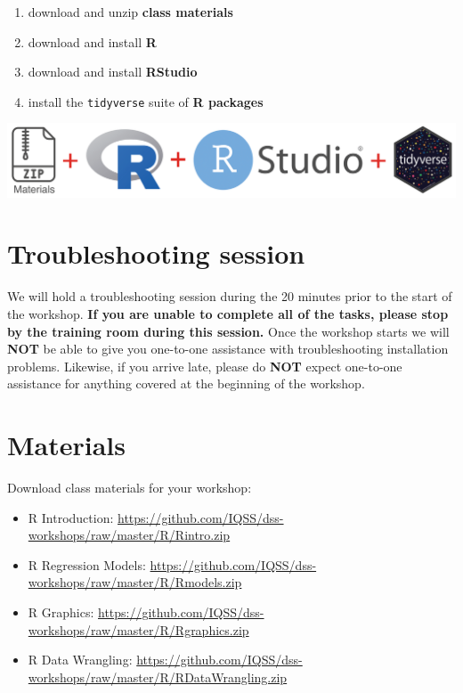 \documentclass[
]{book}
\providecommand{\tightlist}{%
  \setlength{\itemsep}{0pt}\setlength{\parskip}{0pt}}
\begin{document}
\begin{enumerate}
\def\labelenumi{\arabic{enumi}.}
\tightlist
\item
  download and unzip \textbf{class materials}
\item
  download and install \textbf{R}
\item
  download and install \textbf{RStudio}
\item
  install the \texttt{tidyverse} suite of \textbf{R packages}
\end{enumerate}

\includegraphics{R/Rinstall/images/install_software_R.png}

\hypertarget{troubleshooting-session}{%
\section{Troubleshooting session}\label{troubleshooting-session}}

We will hold a troubleshooting session during the 20 minutes prior to the start of the workshop.
\textbf{If you are unable to complete all of the tasks, please stop by the training room during this session.}
Once the workshop starts we will \textbf{NOT} be able to give you one-to-one assistance with troubleshooting installation problems. Likewise, if you arrive late, please do \textbf{NOT} expect one-to-one assistance for anything covered at the beginning of the workshop.

\hypertarget{materials}{%
\section{Materials}\label{materials}}

Download class materials for your workshop:

\begin{itemize}
\tightlist
\item
  R Introduction: \url{https://github.com/IQSS/dss-workshops/raw/master/R/Rintro.zip}
\item
  R Regression Models: \url{https://github.com/IQSS/dss-workshops/raw/master/R/Rmodels.zip}
\item
  R Graphics: \url{https://github.com/IQSS/dss-workshops/raw/master/R/Rgraphics.zip}
\item
  R Data Wrangling: \url{https://github.com/IQSS/dss-workshops/raw/master/R/RDataWrangling.zip}
\end{itemize}
\end{document}
